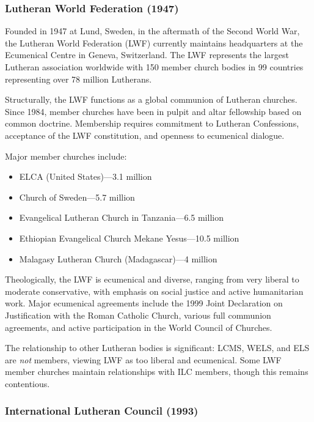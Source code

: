\subsubsection{Lutheran World Federation (1947)}

Founded in 1947 at Lund, Sweden, in the aftermath of the Second World War, the Lutheran World Federation (LWF) currently maintains headquarters at the Ecumenical Centre in Geneva, Switzerland. The LWF represents the largest Lutheran association worldwide with 150 member church bodies in 99 countries representing over 78 million Lutherans.

Structurally, the LWF functions as a global communion of Lutheran churches. Since 1984, member churches have been in pulpit and altar fellowship based on common doctrine. Membership requires commitment to Lutheran Confessions, acceptance of the LWF constitution, and openness to ecumenical dialogue.

Major member churches include:

\begin{itemize}
\item ELCA (United States)---3.1 million
\item Church of Sweden---5.7 million
\item Evangelical Lutheran Church in Tanzania---6.5 million
\item Ethiopian Evangelical Church Mekane Yesus---10.5 million
\item Malagasy Lutheran Church (Madagascar)---4 million
\end{itemize}

Theologically, the LWF is ecumenical and diverse, ranging from very liberal to moderate conservative, with emphasis on social justice and active humanitarian work. Major ecumenical agreements include the 1999 Joint Declaration on Justification with the Roman Catholic Church, various full communion agreements, and active participation in the World Council of Churches.

The relationship to other Lutheran bodies is significant: LCMS, WELS, and ELS are \textit{not} members, viewing LWF as too liberal and ecumenical. Some LWF member churches maintain relationships with ILC members, though this remains contentious.

\subsubsection{International Lutheran Council (1993)}

